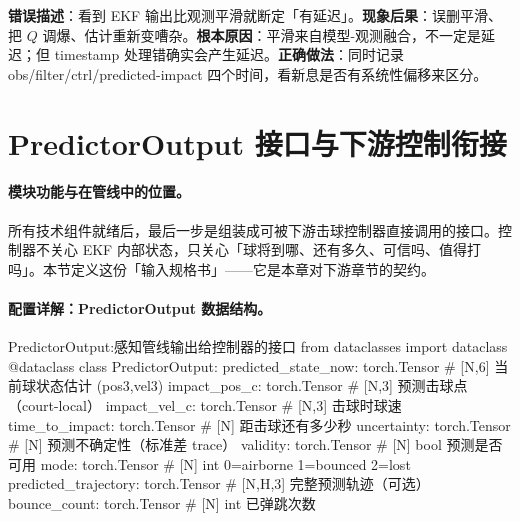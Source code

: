 \begin{pitfall}
\textbf{错误描述}：看到 EKF 输出比观测平滑就断定「有延迟」。\textbf{现象后果}：误删平滑、把 $Q$ 调爆、估计重新变嘈杂。\textbf{根本原因}：平滑来自模型-观测融合，不一定是延迟；但 timestamp 处理错确实会产生延迟。\textbf{正确做法}：同时记录 obs/filter/ctrl/predicted-impact 四个时间，看新息是否有系统性偏移来区分。
\end{pitfall}

\begin{practice}[本节动手任务]
\end{practice}

\section{PredictorOutput 接口与下游控制衔接}
\label{sec:rlmc-perc-interface}

\paragraph{模块功能与在管线中的位置。}所有技术组件就绪后，最后一步是组装成可被下游击球控制器直接调用的接口。控制器不关心 EKF 内部状态，只关心「球将到哪、还有多久、可信吗、值得打吗」。本节定义这份「输入规格书」——它是本章对下游章节的契约。

\paragraph{配置详解：PredictorOutput 数据结构。}

\begin{codebox}[Python]{PredictorOutput:感知管线输出给控制器的接口}
from dataclasses import dataclass
@dataclass
class PredictorOutput:
    predicted_state_now: torch.Tensor   # [N,6] 当前球状态估计 (pos3,vel3)
    impact_pos_c:        torch.Tensor   # [N,3] 预测击球点（court-local）
    impact_vel_c:        torch.Tensor   # [N,3] 击球时球速
    time_to_impact:      torch.Tensor   # [N]   距击球还有多少秒
    uncertainty:         torch.Tensor   # [N]   预测不确定性（标准差 trace）
    validity:            torch.Tensor   # [N] bool 预测是否可用
    mode:                torch.Tensor   # [N] int 0=airborne 1=bounced 2=lost
    predicted_trajectory: torch.Tensor  # [N,H,3] 完整预测轨迹（可选）
    bounce_count:        torch.Tensor   # [N] int 已弹跳次数
\end{codebox}

